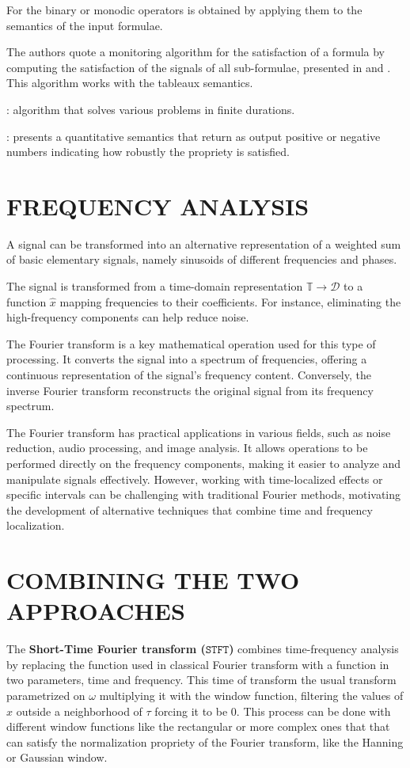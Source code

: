 \documentclass{suftesi}
\renewcommand{\b}{\textbf}
\begin{document}
For the binary or monodic operators is obtained by applying them to the semantics of the input formulae. 

The authors quote a monitoring algorithm for the satisfaction of a formula by computing the satisfaction of the signals of all sub-formulae, presented in \cite{maler2004} and \cite{maler2008}. This algorithm works with the tableaux semantics. 

\cite{nickovic2007}: algorithm that solves various problems in finite durations.

\cite{donze2010}: presents a quantitative semantics that return as output positive or negative numbers indicating how robustly the propriety is satisfied.

\section{FREQUENCY ANALYSIS}

A signal can be transformed into an alternative representation of a weighted sum of basic elementary signals, namely sinusoids of different frequencies and phases.

The signal is transformed from a time-domain representation $\mathbb{T}\to\mathcal{D}$ to a function $\hat{x}$ mapping frequencies to their coefficients. For instance, eliminating the high-frequency components can help reduce noise.

The Fourier transform is a key mathematical operation used for this type of processing. It converts the signal into a spectrum of frequencies, offering a continuous representation of the signal's frequency content. Conversely, the inverse Fourier transform reconstructs the original signal from its frequency spectrum.

The Fourier transform has practical applications in various fields, such as noise reduction, audio processing, and image analysis. It allows operations to be performed directly on the frequency components, making it easier to analyze and manipulate signals effectively. However, working with time-localized effects or specific intervals can be challenging with traditional Fourier methods, motivating the development of alternative techniques that combine time and frequency localization.

\section{COMBINING THE TWO APPROACHES}

The \b{Short-Time Fourier transform ($\mathtt{STFT}$)} combines time-frequency analysis by replacing the function used in classical Fourier transform with a function in two parameters, time and frequency. This time of transform the usual transform parametrized on $\omega$ multiplying it with the window function, filtering the values of $x$ outside a neighborhood of $\tau$ forcing it to be $0$. This process can be done with different window functions like the rectangular or more complex ones that that can satisfy the normalization propriety of the Fourier transform, like the Hanning or Gaussian window.
\end{document}
